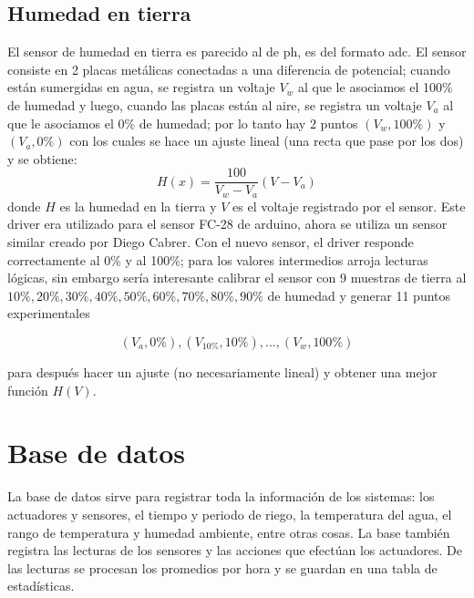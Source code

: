 \documentclass[a4paper,10pt,titlepage]{article}
\begin{document}
\subsection{Humedad en tierra}
El sensor de humedad en tierra es parecido al de ph, es del formato adc. El sensor consiste en 2 placas met\'alicas conectadas a una diferencia de potencial; cuando est\'an 
sumergidas en agua, se registra un voltaje $V_w$ al que le asociamos el 100\% de humedad y luego, cuando las placas est\'an al aire, se registra un voltaje $V_a$ al que le 
asociamos el 0\% de humedad; por lo tanto hay 2 puntos $(V_w,100\%)$ y $(V_a,0\%)$ con los cuales se hace un ajuste lineal (una recta que pase por los 
dos) y se obtiene:
\begin{equation}
	H(x)=\frac{100}{V_{w}-V_{a}}(V-V_{a})
\end{equation}
donde $H$ es la humedad en la tierra y $V$ es el voltaje registrado por el sensor. Este driver era utilizado para el sensor FC-28 de arduino, ahora se utiliza un sensor 
similar creado por Diego Cabrer. Con el nuevo sensor, el driver responde correctamente al 
0\% y al 100\%; para los valores intermedios arroja lecturas l\'ogicas, sin embargo ser\'ia interesante calibrar 
el sensor con 9 muestras de tierra al $10\%, 20\%, 30\%, 40\%, 50\%, 60\%, 70\%, 80\%, 90\%$ de humedad y generar 11 puntos experimentales

\begin{equation}
(V_{a},0\%) , (V_{10\%},10\%), ... , (V_{w},100\%)
\end{equation}

para despu\'es hacer un ajuste (no necesariamente lineal) y obtener una mejor funci\'on $H(V)$.

\section{Base de datos}
La base de datos sirve para registrar toda la informaci\'on de los 
sistemas: los actuadores y sensores, el tiempo y periodo de 
riego, la temperatura del agua, el rango de temperatura y humedad 
ambiente, entre otras cosas. La base tambi\'en registra las lecturas de 
los sensores y las acciones que efect\'uan los actuadores. De las 
lecturas se procesan los promedios por hora y se 
guardan en una tabla de estad\'isticas.
 
\end{document}
